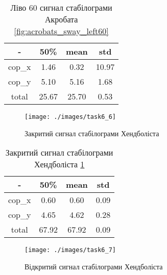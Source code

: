 \begin{table}[!ht]
    \centering
    \caption{Ліво 60 сигнал стабілограми Акробата \ref{fig:acrobats_sway_left60}}
    \label{tab:acrobats_sway_left60}

    \begin{tabular}{|c|c|c|c|}
        \toprule
        -      & 50\%  & mean  & std   \\

        \midrule
        cop\_x & 1.46  & 0.32  & 10.97 \\
        \hline
        cop\_y & 5.10  & 5.16  & 1.68  \\

        \bottomrule
        total  & 25.67 & 25.70 & 0.53  \\
        \hline
    \end{tabular}
\end{table}

\begin{figure}[!ht]
    \centering
    \texttt{[image: ./images/task6\_6]}
    \caption{Закритий сигнал стабілограми Хендболіста}
    \label{fig:handball_base_close}
\end{figure}

\begin{table}[!ht]
    \centering
    \caption{Закритий сигнал стабілограми Хендболіста \ref{fig:handball_base_close}}
    \label{tab:handball_base_close}

    \begin{tabular}{|c|c|c|c|}
        \toprule
        -      & 50\%  & mean  & std  \\

        \midrule
        cop\_x & 0.60  & 0.60  & 0.09 \\
        \hline
        cop\_y & 4.65  & 4.62  & 0.28 \\

        \bottomrule
        total  & 67.92 & 67.92 & 0.09 \\
        \hline
    \end{tabular}
\end{table}

\begin{figure}[!ht]
    \centering
    \texttt{[image: ./images/task6\_7]}
    \caption{Відкритий сигнал стабілограми Хендболіста}
    \label{fig:handball_base_open}
\end{figure}

